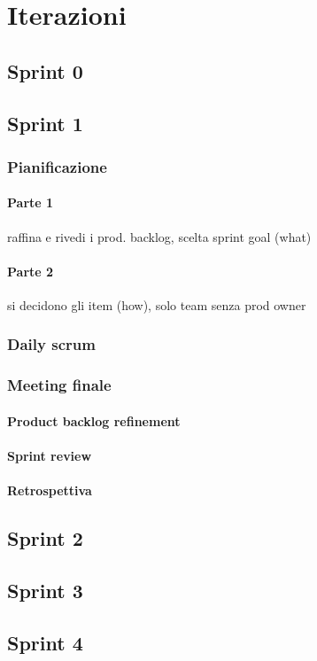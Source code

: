 \chapter{Iterazioni}

\section{Sprint 0}

\section{Sprint 1}
    \subsection{Pianificazione}
        \subsubsection{Parte 1} 
            raffina e rivedi i prod. backlog, scelta sprint goal (what)
        \subsubsection{Parte 2}
            si decidono gli item (how), solo team senza prod owner
    \subsection{Daily scrum}
    \subsection{Meeting finale}
        \subsubsection{Product backlog refinement}
        \subsubsection{Sprint review}
        \subsubsection{Retrospettiva}

    
\section{Sprint 2}


\section{Sprint 3}


\section{Sprint 4}


